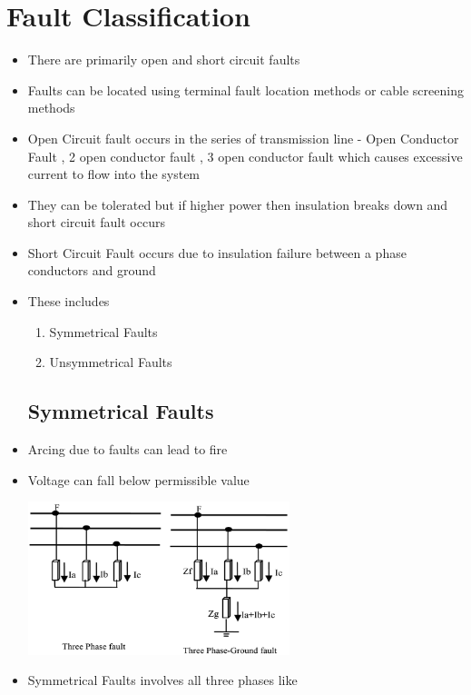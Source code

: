 \documentclass[14pt ,a4paper]{extarticle}
\begin{document}
\tableofcontents
\pagebreak

\section{Fault Classification}
\begin{itemize}
    \item{There are primarily open and short circuit faults}
    \item{Faults can be located using terminal fault location methods or cable screening methods}

    \item{Open Circuit fault occurs in the series of transmission line - Open Conductor Fault , 2 open conductor fault , 3 open conductor fault which causes excessive current to flow into the system}
    \item{They can be tolerated but if higher power then insulation breaks down and short circuit fault occurs}
    \item{Short Circuit Fault occurs due to insulation failure between a phase conductors and ground}
    \item{These includes}
        \begin{enumerate}
            \item{Symmetrical Faults}
            \item{Unsymmetrical Faults}
        \end{enumerate}
        \vspace{40pt}
    \subsection{Symmetrical Faults}
    \item{Arcing due to faults can lead to fire}
    \item{Voltage can fall below permissible value}
        \begin{center}
                \includegraphics[width=0.6\textwidth]{./assets/Two-most-common-symmetrical-fault-types.png}
            \end{center}    
        \item{Symmetrical Faults involves all three phases like}


\end{itemize}
\end{document}
